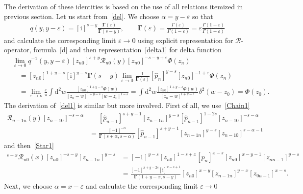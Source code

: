 \documentclass[pdftex]{sigma}
\renewcommand{\imath}{\mathrm{i}}
\numberwithin{equation}{section}
\begin{document}
The derivation of these identities is based on the use
of all relations itemized in previous section.
Let us start from~\eqref{del}.
We choose $\alpha = y-\varepsilon$ so that
\begin{align*}
q(y ,y-\varepsilon) =
[\imath]^{s-y} \frac{\mathbf{\Gamma}(\varepsilon)}{\mathbf{\Gamma}(s-y)}, \qquad
\mathbf{\Gamma}(\varepsilon) =
\frac{\Gamma(\varepsilon)}{\Gamma(1 - \varepsilon)} =
\varepsilon \frac{\Gamma(1+\varepsilon)}{\Gamma(1 - \varepsilon)}
\end{align*}
and calculate the corresponding limit $\varepsilon\to 0$ using explicit
representation for $\mathcal{R}$-operator, formula~\eqref{d} and
then representation~\eqref{delta1} for delta function
\begin{align*}
&
\lim\limits_{\varepsilon\to 0}
q^{-1}(y,y-\varepsilon)
[z_{n0}]^{s+y} \mathcal{R}_{n 0}(y) [z_{n0}]^{-s-y+\varepsilon} \Phi(z_n) \\
&\quad =
[z_{n0}]^{1+y-s} [\imath]^{y-s} \mathbf{\Gamma}(s-y)
\lim\limits_{\varepsilon\to 0}
\frac{1}
{\mathbf{\Gamma}(\varepsilon)}
[\hat{p}_n]^{y-s} [z_{n0}]^{-1+\varepsilon} \Phi(z_n) \\
&\quad =
\lim\limits_{\varepsilon\to o} \frac{\varepsilon}{\pi}
\int \mathrm{d}^2 w \frac{[z_{n0}]^{1+y-s} \Phi(w)}{[z_n-w]^{1+y-s} [w-z_0]^{1-\varepsilon}} =
\int \mathrm{d}^2 w \frac{[z_{n0}]^{1+y-s} \Phi(w)}{[z_n-w]^{1+y-s}}
\delta^2(w-z_0) = \Phi(z_0) .
\end{align*}
The derivation of~\eqref{del1} is similar but more involved.
First of all, we use~\eqref{Chain1}
\begin{align*}
\mathcal{R}_{n-1 n}(y) [z_{n-1 0}]^{-s-\alpha} & = [\hat{p}_{n-1}]^{s+y-1} [z_{n-1 n}]^{y-s}
[\hat{p}_{n-1}]^{1-2s} [z_{n-1 0}]^{-s-\alpha} \\
& = 	
\frac{[-1]^{-\alpha}}{\mathbf{\Gamma}(s+\alpha,s-\alpha)}
[\hat{p}_{n-1}]^{s+y-1} [z_{n-1 n}]^{y-s}
[z_{n-1 0}]^{s-\alpha-1}
\end{align*}
and then~\eqref{Star1}
\begin{align*}
[z_{n0}]^{s+x} \mathcal{R}_{n 0}(x) [z_{n0}]^{-s-y} [z_{n-1 n}]^{y-s} & =
[-1]^{y-s}
[z_{n 0}]^{1-s+x} [p_n]^{x-s} [z_{n 0}]^{x-y-1} [z_{n n-1}]^{y-s} \\
& =
\frac{[-1]^{x+y-2s} [\imath]^{x-s+1}}
{\mathbf{\Gamma}(1+y-x,s-y)}
[z_{n0}]^{x-y} [z_{n-1 n}]^{y-x} [z_{0 n-1}]^{x-s} .
\end{align*}
Next, we choose $\alpha = x-\varepsilon$
and calculate the corresponding limit $\varepsilon\to 0$
\end{document}

